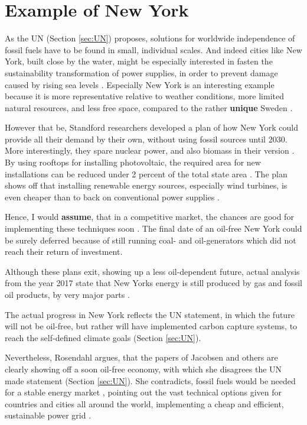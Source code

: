 \section{Example of New York}
\label{sec:NY}
As the UN (Section \ref{sec:UN}) proposes, solutions for worldwide independence of fossil fuels have to be found in small, individual scales.
And indeed cities like New York, built close by the water, might be especially interested in fasten the sustainability transformation of power supplies, 
in order to prevent damage caused by rising sea levels \cite{NY_Sea}. 
Especially New York is an interesting example because it is more representative relative to
weather conditions, more limited natural resources, and less free space, compared to the rather \textbf{unique} Sweden \cite{NY_average}.
\par
However that be, Standford researchers developed a plan of how New York could provide all their demand by their own, without using fossil sources until 2030.
More interestingly, they spare nuclear power, and also biomass in their version \cite[585]{NY_Jacobson}.
By using rooftops for installing photovoltaic, the required area for new installations can be reduced under 2 percent of the total state area \cite[590]{NY_Jacobson}.
The plan shows off that installing renewable energy sources, especially wind turbines, is even cheaper than to back on conventional power supplies \cite[592]{NY_Jacobson}.
\par
Hence, I would \textbf{assume}, that in a competitive market, the chances are good for implementing these techniques soon \cite{capitalism}. 
The final date of an oil-free New York could be surely deferred
because of still running coal- and oil-generators which did not reach their return of investment.
\par
Although these plans exit, showing up a less oil-dependent future, actual analysis from the year 2017 state that New Yorks energy is still produced
by gas and fossil oil products, by very major parts \cite{NY_2017}.
\par
The actual progress in New York reflects the UN statement, in which the future will not be oil-free, but rather will have implemented carbon capture systems, to reach the self-defined climate goals (Section \ref{sec:UN}).
\par
Nevertheless, {\Large Rosendahl argues, that} the papers of Jacobsen and others are clearly showing off a soon oil-free economy, with which she disagrees the UN made statement (Section \ref{sec:UN}).
She contradicts, fossil fuels would be needed for a stable energy market \cite[1]{NYT1}, pointing out the vast technical options 
given for countries and cities all around the world, implementing a cheap and efficient, sustainable power grid \cite[2]{NYT1}.

